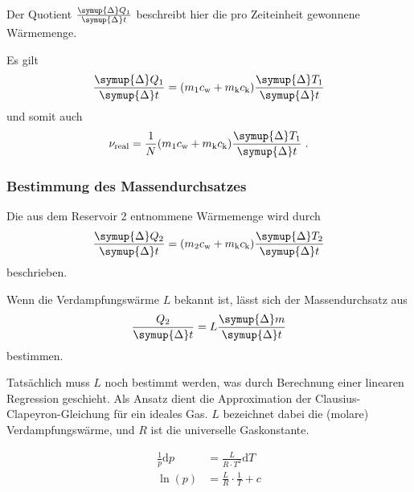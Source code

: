     Der Quotient $\frac{\symup{\Delta} Q_1}{\symup{\Delta} t}$ beschreibt hier die pro Zeiteinheit gewonnene Wärmemenge.

    Es gilt
    \begin{equation*}
        \frac{\symup{\Delta} Q_1}{\symup{\Delta} t} = (m_1 c_\text{w} + m_\text{k} c_\text{k}) \frac{\symup{\Delta} T_1}{\symup{\Delta} t}
    \end{equation*}
    und somit auch
    \begin{equation}
      \label{eqn:reale_gueteziffer}
      \nu_\text{real} = \frac{1}{N} (m_1 c_\text{w} + m_\text{k} c_\text{k}) \frac{\symup{\Delta} T_1}{\symup{\Delta} t} \; .
    \end{equation}


\subsubsection{Bestimmung des Massendurchsatzes}
\label{sec:massendurchsatz}

    Die aus dem Reservoir 2 entnommene Wärmemenge wird durch
    \begin{equation*}
        \frac{\symup{\Delta} Q_2}{\symup{\Delta} t}
        = (m_2 c_\text{w} + m_\text{k} c_\text{k}) \frac{\symup{\Delta} T_2}{\symup{\Delta} t}
    \end{equation*}
    beschrieben.

    Wenn die Verdampfungswärme $L$ bekannt ist, lässt sich der Massendurchsatz aus
    \begin{equation*}
        \frac{Q_2}{\symup{\Delta} t} = L \frac{\symup{\Delta} m}{\symup{\Delta} t}
    \end{equation*}
    bestimmen.

    Tatsächlich muss $L$ noch bestimmt werden, was durch Berechnung einer linearen Regression geschieht.
    Als Ansatz dient die Approximation der Clausius-Clapeyron-Gleichung für ein ideales Gas.
    $L$ bezeichnet dabei die (molare) Verdampfungswärme, und $R$ ist die universelle Gaskonstante.

    \begin{align*}
      \frac{1}{p} \mathrm{d}p &= \frac{L}{R \cdot T^2} \mathrm{d} T \\
      \ln(p) &= \frac{L}{R} \cdot \frac{1}{T} + c \\
    \end{align*}

